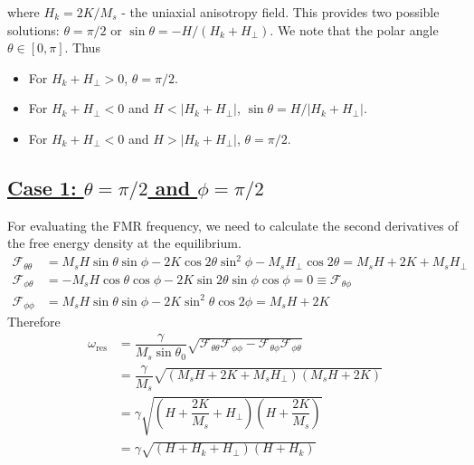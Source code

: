 \documentclass[aps,prb,onecolumn,notitlepage,showpacs,floatfix,superscriptaddress]{revtex4-1}
\newcommand{\mrm}[1]{\mathrm{#1}}
\newcommand{\sint}{\sin\theta}
\newcommand{\cost}{\cos\theta}
\newcommand{\sinp}{\sin \phi}
\newcommand{\cosp}{ \cos\phi}
\newcommand{\fe}{ \mathcal{F}}
\begin{document}
where $H_k = 2K/M_s$ - the uniaxial anisotropy field. This provides two possible solutions: $\theta= \pi/2$ or $\sint = - H /\left(H_k+ H_{\perp}\right)$. We note that the polar angle $\theta \in [0,\pi]$. Thus 
\begin{itemize}
\item For $H_k+ H_{\perp} > 0$, $\theta = \pi/2$. 
\item For $H_k+ H_{\perp} < 0$ and $H < \vert H_k+ H_{\perp} \vert $, $\sint = H /\vert H_k+ H_{\perp}\vert$.
\item For $H_k+ H_{\perp} < 0$ and $H > \vert H_k+ H_{\perp} \vert $, $\theta = \pi/2$.
\end{itemize}

\subsection*{\underline{Case 1:  $\theta=\pi/2$ and $\phi=\pi/2$}}
For evaluating the FMR frequency, we need to calculate the second derivatives of the free energy density at the equilibrium.
\begin{equation}
\begin{split}
\fe_{\theta \theta}  &=  M_s H \sint \sinp - 2 K \cos 2\theta \sin^2 \phi -M_s H_{\perp} \cos 2\theta = M_s H  + 2 K  + M_s H_{\perp}  \\
\fe_{\phi \theta}  &=  - M_s H \cost \cosp - 2 K \sin 2 \theta \sinp \cosp = 0  \equiv \fe_{\theta \phi} \\
\fe_{\phi \phi}  &=   M_s H \sint \sinp - 2 K \sin^2 \theta \cos 2\phi = M_s H  + 2 K 
\end{split}
\end{equation}
Therefore
\begin{equation}
\begin{split}
\omega_\mrm{res} &=  \dfrac{\gamma}{M_s \sint_0} \sqrt{\fe_{\theta \theta} \fe_{\phi \phi}-  \fe_{\theta \phi}\fe_{\phi \theta}}\\
&= \dfrac{\gamma}{M_s} \sqrt{\left(M_s H  + 2 K  + M_s H_{\perp} \right) \left( M_s H  + 2 K  \right) } \\
&=\gamma \sqrt{\left( H  + \dfrac{2 K}{M_s}  +  H_{\perp} \right) \left( H  + \dfrac{2 K}{M_s} \right) } \\
&=\gamma \sqrt{\left( H  + H_k  +  H_{\perp} \right) \left( H  + H_k \right) } \\
\end{split}
\end{equation}
\end{document}
